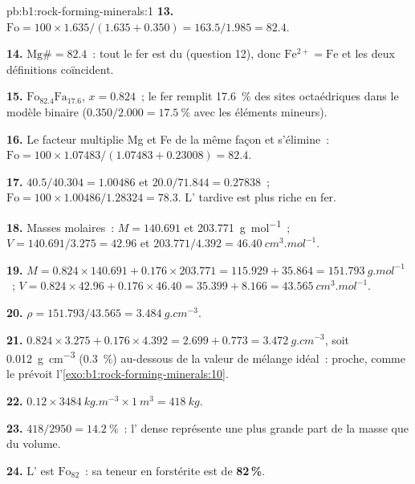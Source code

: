\begin{solution}{pb:b1:rock-forming-minerals:1}
\textbf{13.} $\mathrm{Fo} = 100\times1.635/(1.635 + 0.350) = 163.5/1.985 =
82.4$.

\textbf{14.} $\mathrm{Mg\#} = 82.4$~: tout le fer est du 
(question 12), donc $\mathrm{Fe^{2+}} = \mathrm{Fe}$ et les deux définitions
coïncident.

\textbf{15.} $\text{Fo}_{82.4}\text{Fa}_{17.6}$, $x = 0.824$~; le fer remplit
\qty{17.6}{\percent} des sites octaédriques dans le modèle binaire
($0.350/2.000 = \qty{17.5}{\percent}$ avec les éléments mineurs).

\textbf{16.} Le facteur multiplie Mg et Fe de la même façon et s'élimine~:
$\mathrm{Fo} = 100\times1.07483/(1.07483 + 0.23008) = 82.4$.

\textbf{17.} $40.5/40.304 = 1.00486$ et $20.0/71.844 = 0.27838$~;
$\mathrm{Fo} = 100\times1.00486/1.28324 = 78.3$. L' tardive est plus riche
en fer.

\textbf{18.} Masses molaires~: $M = 140.691$ et \qty{203.771}{g.mol^{-1}}~;
$V = 140.691/3.275 = 42.96$ et $203.771/4.392 =
\qty{46.40}{cm^3.mol^{-1}}$.

\textbf{19.} $M = 0.824\times140.691 + 0.176\times203.771 = 115.929 +
35.864 = \qty{151.793}{g.mol^{-1}}$~; $V = 0.824\times42.96 +
0.176\times46.40 = 35.399 + 8.166 = \qty{43.565}{cm^3.mol^{-1}}$.

\textbf{20.} $\rho = 151.793/43.565 = \qty{3.484}{g.cm^{-3}}$.

\textbf{21.} $0.824\times3.275 + 0.176\times4.392 = 2.699 + 0.773 =
\qty{3.472}{g.cm^{-3}}$, soit \qty{0.012}{g.cm^{-3}} (\qty{0.3}{\percent}) au-dessous
de la valeur de mélange idéal~: proche, comme le prévoit
l'\cref{exo:b1:rock-forming-minerals:10}.

\textbf{22.} $0.12\times\qty{3484}{kg.m^{-3}}\times\qty{1}{m^3} =
\qty{418}{kg}$.

\textbf{23.} $418/2950 = \qty{14.2}{\percent}$~: l' dense représente une
plus grande part de la masse que du volume.

\textbf{24.} L' est $\text{Fo}_{82}$~: sa teneur en forstérite est de
\textbf{82\,\%}.
\end{solution}
